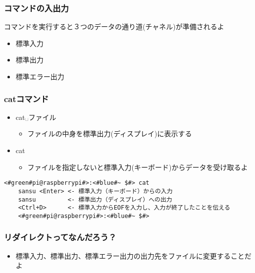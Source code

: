 \begin{frame}
    \frametitle{コマンドの入出力}
    コマンドを実行すると３つのデータの通り道(チャネル)が準備されるよ
    \begin{itemize}
        \item 標準入力
        \item 標準出力
        \item 標準エラー出力
    \end{itemize}
    \begin{figure}[h]
        \centering
        
    \end{figure}
\end{frame}

\begin{frame}[fragile]
    \frametitle{catコマンド}
    \begin{itemize}
        \item cat␣ファイル
        \begin{itemize}
            \item ファイルの中身を標準出力(ディスプレイ)に表示する
        \end{itemize}
        \item cat
        \begin{itemize}
            \item ファイルを指定しないと標準入力(キーボード)からデータを受け取るよ
        \end{itemize}
    \end{itemize}
    \begin{lstlisting}[title=catの標準入力・標準出力, label=stdioCat]
    <#green#pi@raspberrypi#>:<#blue#~ $#> cat 
    sansu <Enter> <- 標準入力（キーボード）からの入力
    sansu         <- 標準出力（ディスプレイ）への出力
    <Ctrl+D>      <- 標準入力からEOFを入力し、入力が終了したことを伝える
    <#green#pi@raspberrypi#>:<#blue#~ $#>
    \end{lstlisting}
\end{frame}

\begin{frame}
    \frametitle{リダイレクトってなんだろう？}
    \begin{itemize}
        \item 標準入力、標準出力、標準エラー出力の出力先をファイルに変更することだよ
    \end{itemize}
    \begin{figure}
        \centering
        
    \end{figure}
\end{frame}

